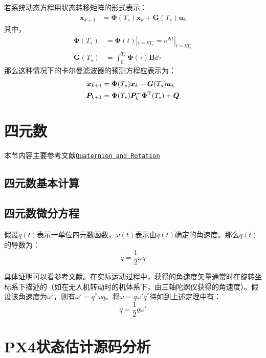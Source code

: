 
若系统动态方程用状态转移矩阵的形式表示：
\begin{align*}
    \bm{x}_{k+1} &= \bm{\Phi}(T_s) \bm{x}_k + \bm{G}(T_s) \bm{u}_k 
\end{align*}
其中，
\begin{align*}
    \bm{\Phi}(T_s) &= \bm{\Phi}(t)|_{t=k T_s} = e^{\bm{A} t}|_{t=k T_s} \\
    \bm{G}(T_s) &= \int_0^{T_s}{\bm{\Phi}(\tau) \bm{B}}\dd \tau
\end{align*}
那么这种情况下的卡尔曼滤波器的预测方程应表示为：
\begin{align*}
    \bm{x}_{k+1} &= \bm{\Phi}(T_s) \bm{x}_k + \bm{G}(T_s) \bm{u}_k \\
    \bm{P}_{k+1} &= \bm{\Phi}(T_s) \bm{P}_k^+ \bm{\Phi}^{\mathrm{T}}(T_s) + \bm{Q}
\end{align*}

\section{四元数}
本节内容主要参考文献\href{attachment/Quaternion and Rotation.pdf}{\texttt{Quaternion and Rotation}}
\subsection{四元数基本计算}

\subsection{四元数微分方程}
\begin{theorem}
    假设$q(t)$表示一单位四元数函数，$\omega(t)$表示由$q(t)$确定的角速度。那么$q(t)$的导数为：
    \begin{equation*}
        \dot{q} = \frac 1 2 \omega q
    \end{equation*}
\end{theorem}
具体证明可以看参考文献。在实际运动过程中，获得的角速度矢量通常时在旋转坐标系下描述的（如在无人机转动时的机体系下，由三轴陀螺仪获得的角速度）。假设该角速度为$\omega '$，则有$\omega ' = q^*\omega q$。将$\omega = q \omega ' q^*$待如到上述定理中有：
\begin{equation*}
    \dot{q} = \frac 1 2 q \omega '
\end{equation*}


\section{PX4状态估计源码分析}
